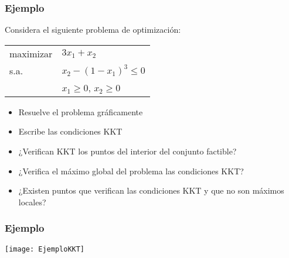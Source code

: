 \documentclass{beamer}
\begin{document}
\begin{frame}
\frametitle{Ejemplo}


Considera el siguiente problema de optimización:

\begin{center}
\begin{tabular}{ll}
maximizar & $3x_1+x_2$   \\
s.a. & $x_2 - (1-x_1)^3 \leq 0$ \\
  & $x_1\geq 0$, $x_2\geq 0$
\end{tabular}
\end{center}




\begin{itemize}
\item Resuelve el problema gráficamente
\item Escribe las condiciones KKT
\item ¿Verifican KKT los puntos del interior del conjunto factible?
\item ¿Verifica el máximo global del problema las condiciones KKT?
\item ¿Existen puntos que verifican las condiciones KKT y que no son máximos locales?
\end{itemize}




\end{frame}
\begin{frame}
\frametitle{Ejemplo}

\begin{center}
\texttt{[image: EjemploKKT]}
\end{center}

\end{frame}
\end{document}
